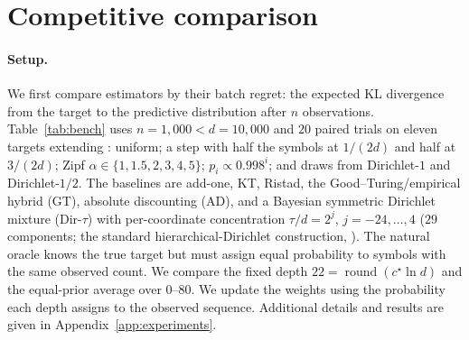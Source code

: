 \documentclass[anon]{alt2027}
\newcommand{\cstar}{c^{\star}}
\begin{document}
\section{Competitive comparison}
\label{sec:experiments}

\paragraph{Setup.}
We first compare estimators by their batch regret: the expected KL divergence from the target to the predictive distribution after $n$ observations. Table~\ref{tab:bench} uses $n=1{,}000<d=10{,}000$ and $20$ paired trials on eleven targets extending \citet{orlitsky2015competitive}: uniform; a step with half the symbols at $1/(2d)$ and half at $3/(2d)$; Zipf $\alpha\in\{1,1.5,2,3,4,5\}$; $p_i\propto0.998^i$; and draws from Dirichlet-$1$ and Dirichlet-$1/2$.
The baselines are add-one, KT, Ristad, the Good--Turing/empirical hybrid (GT), absolute discounting (AD), and a Bayesian symmetric Dirichlet mixture (Dir-$\tau$) with per-coordinate concentration $\tau/d=2^j$, $j=-24,\ldots,4$ ($29$ components; the standard hierarchical-Dirichlet construction, \citealp{mackay1995hierarchical,friedman1998efficient,minka2000estimating}). The natural oracle knows the true target but must assign equal probability to symbols with the same observed count. We compare the fixed depth $22=\operatorname{round}(\cstar\ln d)$ and the equal-prior average over $0$--$80$. We update the weights using the probability each depth assigns to the observed sequence. Additional details and results are given in Appendix~\ref{app:experiments}.
\end{document}
